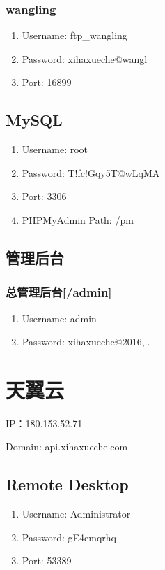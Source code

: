 \documentclass[UTF8, a4paper, titlepage]{ctexart}
\begin{document}
\subsubsection{wangling}
\begin{enumerate}
    \item Username: ftp\_wangling
    \item Password: xihaxueche@wangl
    \item Port: 16899
\end{enumerate}

\subsection{MySQL}
\begin{enumerate}
    \item Username: root
    \item Password: T!fc!Gqy5T@wLqMA
    \item Port: 3306
    \item PHPMyAdmin Path: /pm
\end{enumerate}

\subsection{管理后台}
\subsubsection{总管理后台[/admin]}
\begin{enumerate}
    \item Username: admin
    \item Password: xihaxueche@2016,..
\end{enumerate}


\newpage
\section{天翼云}
IP：180.153.52.71

Domain: api.xihaxueche.com

\subsection{Remote Desktop}
\begin{enumerate}
    \item Username: Administrator
    \item Password: gE4emqrhq
    \item Port: 53389
\end{enumerate}
\end{document}
